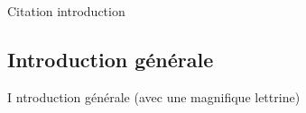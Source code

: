 \begin{savequote}[60mm]
Citation introduction
\end{savequote}

{}
\adjustmtc

\thispagestyle{plain}

\vspace*{-1cm}
\begin{flushright}
\chapter*{Introduction générale}
\end{flushright}
\vspace{2cm}

\chead[\fancyplain{}{}]
      {\fancyplain{}{}}
\lfoot[\fancyplain{}{\thepage}]%
      {\fancyplain{}{}}
\cfoot[\fancyplain{}{}]
      {\fancyplain{}{}}
\rfoot[\fancyplain{}{}]%
     {\fancyplain{}{\thepage}}
     


\lettrine[lines=1]{I}{ }ntroduction générale (avec une magnifique lettrine)




